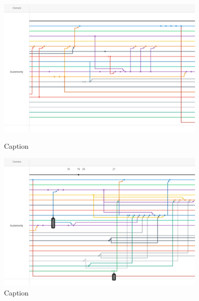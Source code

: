 \begin{figure}
    \includegraphics[width=0.9\textwidth]{Report/root/5.png}
    \caption{Caption}
    \includegraphics[width=0.9\textwidth]{Report/root/6.png}
    \caption{Caption}
    \end{figure}

